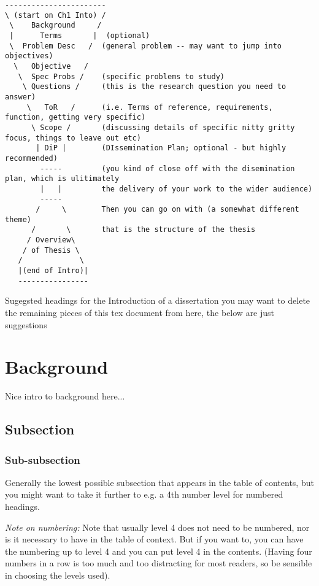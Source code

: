 \begin{lstlisting}
-----------------------
\ (start on Ch1 Into) /
 \    Background     /
 |      Terms       |  (optional)
 \  Problem Desc   /  (general problem -- may want to jump into objectives)
  \   Objective   /
   \  Spec Probs /    (specific problems to study)
    \ Questions /     (this is the research question you need to answer)
     \   ToR   /      (i.e. Terms of reference, requirements, function, getting very specific)
      \ Scope /       (discussing details of specific nitty gritty focus, things to leave out etc)
       | DiP |        (DIssemination Plan; optional - but highly recommended)
        -----         (you kind of close off with the disemination plan, which is ulitimately 
        |   |         the delivery of your work to the wider audience)
        -----
       /     \        Then you can go on with (a somewhat different theme)
      /       \       that is the structure of the thesis
     / Overview\
    / of Thesis \
   /             \
   |(end of Intro)|
   ----------------
\end{lstlisting}


{\color{red}Sugegsted headings for the Introduction of a dissertation you may want to delete the remaining pieces of this tex document from here, the below are just suggestions}


\section{Background}

Nice intro to background here...

\subsection{Subsection}
\subsubsection{Sub-subsection}

Generally the lowest possible subsection that appears in the table of contents, but you might want to take it further to e.g. a 4th number level for numbered headings.

\emph{Note on numbering:} Note that usually level 4 does not need to be numbered, nor is it necessary to have in the table of context. But if you want to, you can have the numbering up to level 4 and you can put level 4 in the contents. (Having four numbers in a row is too much and too distracting for most readers, so be sensible in choosing the levels used).

